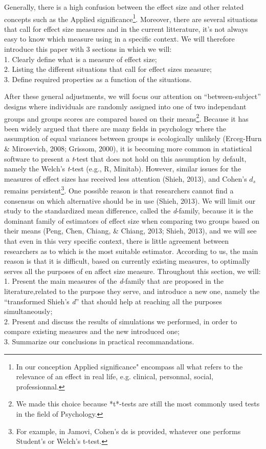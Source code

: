 \documentclass[
  man]{apa6}
\begin{document}
Generally, there is a high confusion between the effect size and other related concepts such as the Applied significance\footnote{In our conception  Applied significance" encompass all what refers to the relevance of an effect in real life, e.g. clinical, personnal, social, professionnal.}. Moreover, there are several situations that call for effect size measures and in the current litterature, it's not always easy to know which measure using in a specific context. We will therefore introduce this paper with 3 sections in which we will:\\
1. Clearly define what is a measure of effect size;\\
2. Listing the different situations that call for effect sizes measure;\\
3. Define required properties as a function of the situations.

After these general adjustments, we will focus our attention on \enquote{between-subject} designs where individuals are randomly assigned into one of two independant groups and groups scores are compared based on their means\footnote{We made this choice because *t*-tests are still the most commonly used tests in the field of Psychology.}. Because it has been widely argued that there are many fields in psychology where the assumption of equal variances between groups is ecologically unlikely (Erceg-Hurn \& Mirosevich, 2008; Grissom, 2000), it is becoming more common in statistical software to present a \emph{t}-test that does not hold on this assumption by default, namely the Welch's \emph{t}-test (e.g., R, Minitab). However, similar issues for the measures of effect sizes has received less attention (Shieh, 2013), and Cohen's \(d_s\) remains persistent\footnote{For example, in Jamovi, Cohen's ds is provided, whatever one performs Student's or Welch's t-test.}. One possible reason is that researchers cannot find a consensus on which alternative should be in use (Shieh, 2013). We will limit our study to the standardized mean difference, called the \emph{d}-family, because it is the dominant family of estimators of effect size when comparing two groups based on their means (Peng, Chen, Chiang, \& Chiang, 2013; Shieh, 2013), and we will see that even in this very specific context, there is little agreement between researchers as to which is the most suitable estimator. According to us, the main reason is that it is difficult, based on currently existing measures, to optimally serves all the purposes of en affect size measure. Throughout this section, we will:\\
1. Present the main measures of the \emph{d}-family that are proposed in the literature,related to the purpose they serve, and introduce a new one, namely the \enquote{transformed Shieh's \emph{d}} that should help at reaching all the purposes simultaneously;\\
2. Present and discuss the results of simulations we performed, in order to compare existing measures and the new introduced one;\\
3. Summarize our conclusions in practical recommandations.
\end{document}
